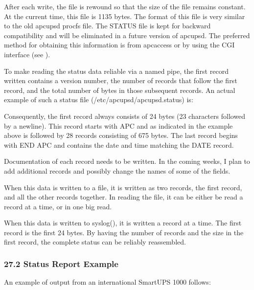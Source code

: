 {{{{{{{{{{{{{{{After each write, the file is rewound so that the size of the file remains
constant. At the current time, this file is 1135 bytes. The format of this
file is very similar to the old apcupsd procfs file. The STATUS file is kept
for backward compatibility and will be eliminated in a future version of
apcupsd. The preferred method for obtaining this information is from apcaccess
or by using the CGI interface (see 
).  

To make reading the status data reliable via a named pipe, the first record
written contains a version number, the number of records that follow the first
record, and the total number of bytes in those subsequent records. An actual
example of such a status file (/etc/apcupsd/apcupsd.status) is:  

Consequently, the first record always consists of 24 bytes (23 characters
followed by a newline). This record starts with APC and as indicated in the
example above is followed by 28 records consisting of 675 bytes. The last
record begins with END APC and contains the date and time matching the DATE
record.  

Documentation of each record needs to be written. In the coming weeks, I plan
to add additional records and possibly change the names of some of the fields.
 

When this data is written to a file, it is written as two records, the first
record, and all the other records together. In reading the file, it can be
either be read a record at a time, or in one big read.  

When this data is written to syslog(), it is written a record at a time. The
first record is the first 24 bytes. By having the number of records and the
size in the first record, the complete status can be reliably reassembled. 

\label{Status-Report-Example}

\subsubsection*{27.2 Status Report Example}

\label{index-Examples_002c-Status-Report-254}
\label{index-Status-255}
An example of output from an international SmartUPS 1000 follows: 

}}}}}}}}}}}}}}}
